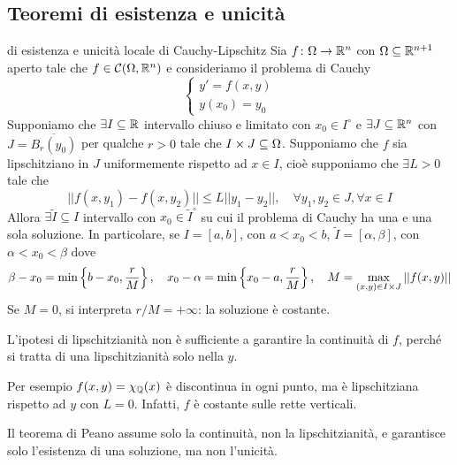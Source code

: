 \documentclass[a4paper]{article}
\begin{document}
\subsection{Teoremi di esistenza e unicità}

\begin{radioactive}
\begin{snippettheorem}{di esistenza e unicità locale di Cauchy-Lipschitz}
    Sia \(f\colon \Omega \to \mathbb{R}^n\) con \(\Omega \subseteq \mathbb{R}^{n+1}\) aperto
    tale che \(f \in \mathcal C(\Omega, \mathbb{R}^n)\)
    e consideriamo il problema di Cauchy
    \[
        \begin{cases}
            y' = f(x,y) \\
            y(x_0) = y_0
        \end{cases}
    \]
    Supponiamo che \(\exists I \subseteq \mathbb{R}\) intervallo chiuso e limitato con \(x_0 \in I^\circ\) e
    \(\exists J \subseteq \mathbb{R}^n\) con \(J = \overline{B_r(y_0)}\) per qualche \(r>0\) tale che
    \(I \times J \subseteq \Omega\). Supponiamo che \(f\) sia lipschitziano
    in \(J\) uniformemente rispetto ad \(x \in I\), cioè supponiamo che \(\exists L > 0\) tale che
    \[
        ||f(x,y_1) - f(x, y_2)|| \leq L||y_1-y_2||, \quad \forall y_1, y_2 \in J, \forall x \in I
    \]
    Allora \(\exists \tilde I \subseteq I\) intervallo con \(x_0 \in \tilde I^\circ\) su cui il problema di Cauchy
    ha una e una sola soluzione. In particolare, se \(I=[a,b]\), con \(a < x_0 < b\), \(\tilde I = [\alpha, \beta]\),
    con \(\alpha < x_0 < \beta\) dove
    \[
        \beta-x_0 = \min\left\{b-x_0, \frac{r}{M}\right\}, \quad
        x_0-\alpha = \min\left\{x_0-a, \frac{r}{M}\right\}, \quad
        M = \max_{(x,y) \in I \times J} ||f(x,y)||
    \]
    Se \(M=0\), si interpreta \(r/M=+\infty\): la soluzione è costante.
\end{snippettheorem}
\end{radioactive}

\begin{radioactive}
L'ipotesi di lipschitzianità non è sufficiente a garantire la continuità
di \(f\), perché si tratta di una lipschitzianità solo nella \(y\).

Per esempio \(f(x,y) = \chi_{\mathbb{Q}}(x)\) è discontinua in ogni punto, ma è lipschitziana rispetto ad \(y\) con \(L=0\).
Infatti, \(f\) è costante sulle rette verticali.

Il teorema di Peano assume solo la continuità, non la lipschitzianità, e garantisce solo l'esistenza di una soluzione, ma non l'unicità.
\end{radioactive}
\end{document}
